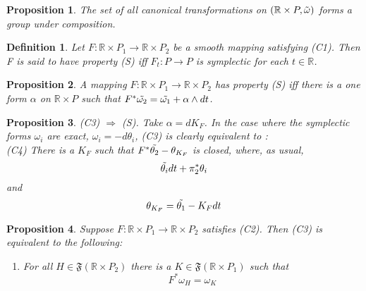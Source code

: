 \documentclass{article}
\newtheorem{defn}{Definition}
\newtheorem{prop}{Proposition}
\begin{document}
\begin{prop}

The set of all canonical transformations on $(\mathbb{R} \times P, \Tilde{\omega})$ forms a group under composition.

\end{prop}

\begin{defn}
    Let $F: \mathbb{R} \times P_1 \to \mathbb{R} \times P_2$ be a smooth mapping satisfying (C1). Then F is said to have property (S) iff $F_t: P \to P$ is symplectic for each $t \in \mathbb{R}$.

\end{defn}

\begin{prop}
    A mapping $F: \mathbb{R} \times P_1 \to \mathbb{R}\times P_2$ has property (S) iff there is a one form $\alpha$ on $\mathbb{R} \times P$ such that $F^*\Tilde{\omega_2} = \Tilde{\omega_1} + \alpha \wedge dt$.

\end{prop}

\begin{prop}
    (C3) $\Rightarrow$ (S). Take $\alpha = dK_F$. In the case where the symplectic forms $\omega_i$ are exact, $\omega_i=-d\theta_i$, (C3) is clearly equivalent to :\\

    (C4) There is a $K_F$ such that $F^*\Tilde{\theta_2} - \theta_{K_F}$ is closed, where, as usual,
    \[ \Tilde{\theta_i} dt + \pi_2^* \theta_i \]
    and
    \[ \theta_{K_F} = \Tilde{\theta_1} - K_F dt \]
\end{prop}

\begin{prop}
    Suppose $F: \mathbb{R} \times P_1 \to \mathbb{R} \times P_2$ satisfies (C2). Then (C3) is equivalent to the following:\\
    

    \begin{enumerate}
    \item[C5] For all $H \in \mathfrak{F}(\mathbb{R} \times P_2)$ there is a $K \in \mathfrak{F}(\mathbb{R} \times P_1)$ such that
    \[ F^*\omega_H = \omega_K \]
    \end{enumerate}

\end{prop}
\end{document}
